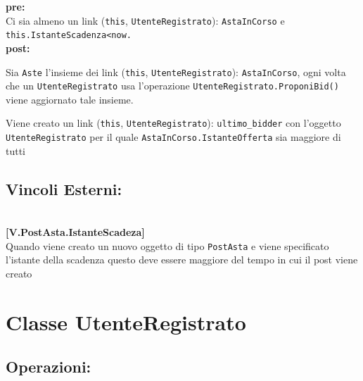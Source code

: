 \documentclass{article}
\begin{document}
\begin{enumerate}
\begin{enumerate}
        \textbf{pre:} \\
        Ci sia almeno un link (\texttt{this}, \texttt{UtenteRegistrato}): \texttt{AstaInCorso} e \texttt{this.IstanteScadenza<now.}\\
        
        \textbf{post:}
        
        Sia \texttt{Aste} l'insieme dei link (\texttt{this}, \texttt{UtenteRegistrato}): \texttt{AstaInCorso}, ogni volta che un \texttt{UtenteRegistrato} usa l'operazione \texttt{UtenteRegistrato.ProponiBid()} viene aggiornato tale insieme.
        
        Viene creato un link (\texttt{this}, \texttt{UtenteRegistrato}): \texttt{ultimo\_bidder} con l'oggetto \texttt{UtenteRegistrato} per il quale \texttt{AstaInCorso.IstanteOfferta} sia maggiore di tutti
    \end{enumerate}
\end{enumerate}

\subsection{Vincoli Esterni:}\\

    \textbf{[V.PostAsta.IstanteScadeza]}\\
     Quando viene creato un nuovo oggetto di tipo \texttt{PostAsta} e viene specificato l'istante della scadenza questo deve essere maggiore del tempo in cui il post viene creato



\section{Classe UtenteRegistrato}

\subsection{Operazioni:}
\end{document}
